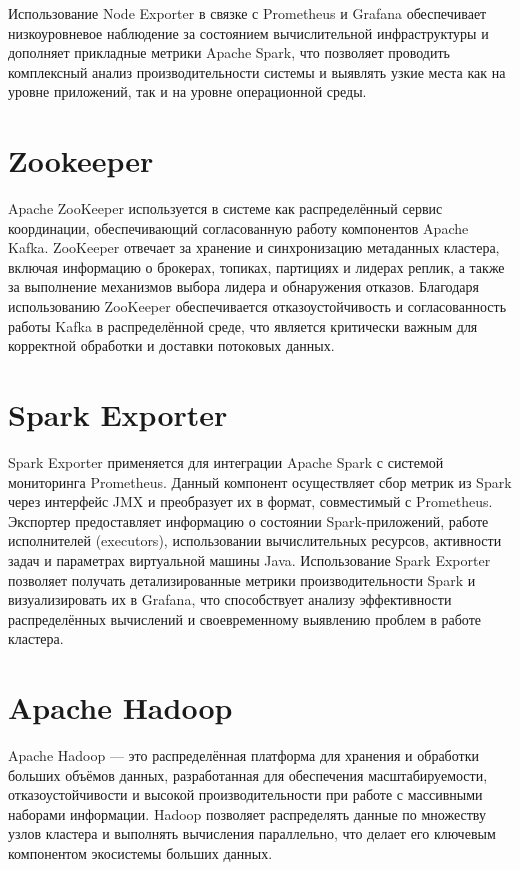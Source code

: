 \documentclass[14pt,a4paper]{extarticle}
\begin{document}
Использование Node Exporter в связке с Prometheus и Grafana обеспечивает
низкоуровневое наблюдение за состоянием вычислительной инфраструктуры и
дополняет прикладные метрики Apache Spark, что позволяет проводить комплексный
анализ производительности системы и выявлять узкие места как на уровне
приложений, так и на уровне операционной среды.

\section{Zookeeper}
Apache ZooKeeper используется в системе как распределённый сервис координации,
обеспечивающий согласованную работу компонентов Apache Kafka. ZooKeeper
отвечает за хранение и синхронизацию метаданных кластера, включая информацию о
брокерах, топиках, партициях и лидерах реплик, а также за выполнение механизмов
выбора лидера и обнаружения отказов. Благодаря использованию ZooKeeper
обеспечивается отказоустойчивость и согласованность работы Kafka в
распределённой среде, что является критически важным для корректной обработки и
доставки потоковых данных.

\section{Spark Exporter}
Spark Exporter применяется для интеграции Apache Spark с системой мониторинга
Prometheus. Данный компонент осуществляет сбор метрик из Spark через интерфейс
JMX и преобразует их в формат, совместимый с Prometheus. Экспортер
предоставляет информацию о состоянии Spark-приложений, работе исполнителей
(executors), использовании вычислительных ресурсов, активности задач и
параметрах виртуальной машины Java. Использование Spark Exporter позволяет
получать детализированные метрики производительности Spark и визуализировать их
в Grafana, что способствует анализу эффективности распределённых вычислений и
своевременному выявлению проблем в работе кластера.

\newpage
\section{Apache Hadoop}
Apache Hadoop — это распределённая платформа для хранения и обработки больших
объёмов данных, разработанная для обеспечения масштабируемости,
отказоустойчивости и высокой производительности при работе с массивными
наборами информации. Hadoop позволяет распределять данные по множеству узлов
кластера и выполнять вычисления параллельно, что делает его ключевым
компонентом экосистемы больших данных.
\end{document}
